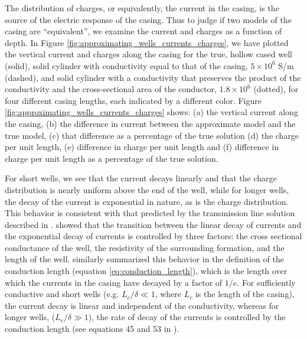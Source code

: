 \documentclass[extra,mreferee]{gji}
\begin{document}
The distribution of charges, or equivalently, the current in the casing, is the source of the electric response of the casing. Thus to judge if two models of the casing are ``equivalent'', we examine the current and charges as a function of depth. In Figure \ref{fig:approximating_wells_currents_charges}, we have plotted the vertical current and charges along the casing for the true, hollow cased well (solid), solid cylinder with conductivity equal to that of the casing, $5 \times 10^6$ S/m (dashed), and solid cylinder with a conductivity that preserves the product of the conductivity and the cross-sectional area of the conductor, $1.8 \times 10^6$ (dotted), for four different casing lengths, each indicated by a different color. Figure \ref{fig:approximating_wells_currents_charges} shows: (a) the vertical current along the casing, (b) the difference in current between the approximate model and the true model, (c) that difference as a percentage of the true solution (d) the charge per unit length, (e) difference in charge per unit length and (f) difference in charge per unit length as a percentage of the true solution.




For short wells, we see that the current decays linearly and that the charge distribution is nearly uniform above the end of the well, while for longer wells, the decay of the current is exponential in nature, as is the charge distribution. This behavior is consistent with that predicted by the transmission line solution described in \cite{Kaufman1993}. \cite{Kaufman1993} showed that the transition between the linear decay of currents and the exponential decay of currents is controlled by three factors: the cross sectional conductance of the well, the resistivity of the surrounding formation, and the length of the well. \cite{Schenkel1991} similarly summarized this behavior in the definition of the conduction length (equation \ref{eq:conduction_length}), which is the length over which the currents in the casing have decayed by a factor of $1/e$. For sufficiently conductive and short wells (e.g. $L_c / \delta \ll 1$, where $L_c$ is the length of the casing), the current decay is linear and independent of the conductivity, whereas for longer wells, ($L_c / \delta \gg 1$), the rate of decay of the currents is controlled by the conduction length (see equations 45 and 53 in \cite{Kaufman1993}).
\end{document}
